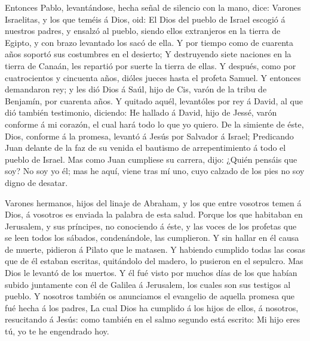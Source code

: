  Entonces Pablo, levantándose, hecha señal de silencio con
la mano, dice: Varones Israelitas, y los que teméis á Dios, oid:
 El Dios del pueblo de Israel escogió á nuestros padres, y
ensalzó al pueblo, siendo ellos extranjeros en la tierra de Egipto, y
con brazo levantado los sacó de ella.  Y por tiempo como de
cuarenta años soportó sus costumbres en el desierto;  Y
destruyendo siete naciones en la tierra de Canaán, les repartió por
suerte la tierra de ellas.  Y después, como por
cuatrocientos y cincuenta años, dióles jueces hasta el profeta Samuel.
 Y entonces demandaron rey; y les dió Dios á Saúl, hijo de
Cis, varón de la tribu de Benjamín, por cuarenta años.  Y
quitado aquél, levantóles por rey á David, al que dió también
testimonio, diciendo: He hallado á David, hijo de Jessé, varón conforme
á mi corazón, el cual hará todo lo que yo quiero.  De la
simiente de éste, Dios, conforme á la promesa, levantó á Jesús por
Salvador á Israel;  Predicando Juan delante de la faz de su
venida el bautismo de arrepentimiento á todo el pueblo de Israel.
 Mas como Juan cumpliese su carrera, dijo: ¿Quién pensáis
que soy? No soy yo él; mas he aquí, viene tras mí uno, cuyo calzado de
los pies no soy digno de desatar.

 Varones hermanos, hijos del linaje de Abraham, y los que
entre vosotros temen á Dios, á vosotros es enviada la palabra de esta
salud.  Porque los que habitaban en Jerusalem, y sus
príncipes, no conociendo á éste, y las voces de los profetas que se leen
todos los sábados, condenándole, las cumplieron.  Y sin
hallar en él causa de muerte, pidieron á Pilato que le matasen.
 Y habiendo cumplido todas las cosas que de él estaban
escritas, quitándolo del madero, lo pusieron en el sepulcro.
 Mas Dios le levantó de los muertos.  Y él fué
visto por muchos días de los que habían subido juntamente con él de
Galilea á Jerusalem, los cuales son sus testigos al pueblo.
 Y nosotros también os anunciamos el evangelio de aquella
promesa que fué hecha á los padres,  La cual Dios ha
cumplido á los hijos de ellos, á nosotros, resucitando á Jesús: como
también en el salmo segundo está escrito: Mi hijo eres tú, yo te he
engendrado hoy.

